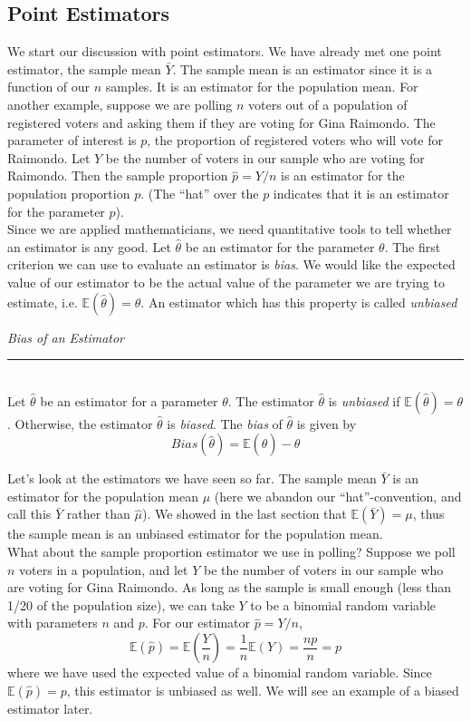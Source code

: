\documentclass[12pt]{article}
\theoremstyle{definition}
\theoremstyle{remark}
\def\E{{\mathbb E}}
\begin{document}
\subsection{Point Estimators}
We start our discussion with point estimators. We have already met one point estimator, the sample mean $\bar{Y}$. The sample mean is an estimator since it is a function of our $n$ samples. It is an estimator for the population mean. For another example, suppose we are polling $n$ voters out of a population of registered voters and asking them if they are voting for Gina Raimondo. The parameter of interest is $p$, the proportion of registered voters who will vote for Raimondo. Let $Y$ be the number of voters in our sample who are voting for Raimondo. Then the sample proportion $\hat{p} = Y/n$ is an estimator for the population proportion $p$. (The ``hat'' over the $p$ indicates that it is an estimator for the parameter $p$).\\

Since we are applied mathematicians, we need quantitative tools to tell whether an estimator is any good. Let $\hat{\theta}$ be an estimator for the parameter $\theta$. The first criterion we can use to evaluate an estimator is \emph{bias}. We would like the expected value of our estimator to be the actual value of the parameter we are trying to estimate, i.e. $\E(\hat{\theta}) = \theta$. An estimator which has this property is called \emph{unbiased}

\begin{framed}
\emph{Bias of an Estimator}\\
  \rule{\dimexpr{}\fboxrule}{.1pt} \\
Let $\hat{\theta}$ be an estimator for a parameter $\theta$. The estimator $\hat{\theta}$ is \emph{unbiased} if $\E(\hat{\theta}) = \theta$. Otherwise, the estimator $\hat{\theta}$ is \emph{biased}. The \emph{bias} of $\hat{\theta}$ is given by
\[
Bias(\hat{\theta}) = \E(\hat{\theta}) - \theta
\]
\end{framed}

Let's look at the estimators we have seen so far. The sample mean $\bar{Y}$ is an estimator for the population mean $\mu$ (here we abandon our ``hat''-convention, and call this $\bar{Y}$ rather than $\hat{\mu}$). We showed in the last section that $\E(\bar{Y}) = \mu$, thus the sample mean is an unbiased estimator for the population mean.\\

What about the sample proportion estimator we use in polling? Suppose we poll $n$ voters in a population, and let $Y$ be the number of voters in our sample who are voting for Gina Raimondo. As long as the sample is small enough (less than 1/20 of the population size), we can take $Y$ to be a binomial random variable with parameters $n$ and $p$. For our estimator $\hat{p} = Y/n$, 
\[
\E(\hat{p}) = \E\left( \frac{Y}{n} \right) = \frac{1}{n}\E(Y) = \frac{np}{n} = p
\]
where we have used the expected value of a binomial random variable. Since $\E(\hat{p}) = p$, this estimator is unbiased as well. We will see an example of a biased estimator later.\\
\end{document}
